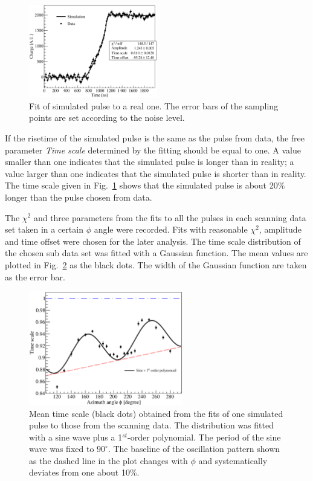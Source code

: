\begin{figure}
\centering
\includegraphics[width=0.5\textwidth]{PSs2d}
\caption{Fit of simulated pulse to a real one. The error bars of the sampling points are set according to the noise level.}
\label{fig:psa:s2d}
\end{figure}

If the risetime of the simulated pulse is the same as the pulse from data, the free parameter \emph{Time scale} determined by the fitting should be equal to one. A value smaller than one indicates that the simulated pulse is longer than in reality; a value larger than one indicates that the simulated pulse is shorter than in reality. The time scale given in Fig.~\ref{fig:psa:s2d} shows that the simulated pulse is about 20\% longer than the pulse chosen from data.

The $\chi^{2}$ and three parameters from the fits to all the pulses in each scanning data set taken in a certain $\phi$ angle were recorded. Fits with reasonable $\chi^{2}$, amplitude and time offset were chosen for the later analysis. The time scale distribution of the chosen sub data set was fitted with a Gaussian function. The mean values are plotted in Fig.~\ref{fig:psa:tsc} as the black dots. The width of the Gaussian function are taken as the error bar.

\begin{figure}[htbp]
\centering
\includegraphics[width=0.6\textwidth]{tsc}
\caption{Mean time scale (black dots) obtained from the fits of one simulated pulse to those from the scanning data. The distribution was fitted with a sine wave plus a 1$^{st}$-order polynomial. The period of the sine wave was fixed to $90^{\circ}$. The baseline of the oscillation pattern shown as the dashed line in the plot changes with $\phi$ and systematically deviates from one about 10\%.}
\label{fig:psa:tsc}
\end{figure}

